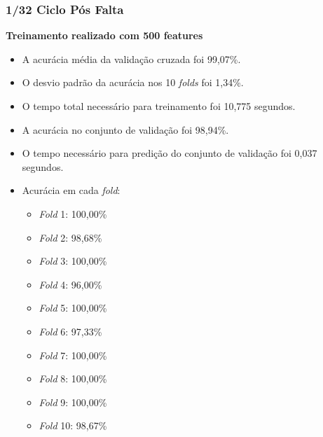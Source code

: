 \subsubsection{1/32 Ciclo Pós Falta}
\textbf{Treinamento realizado com 500 features}
\begin{itemize}
    \item A acurácia média da validação cruzada foi 99,07\%.
    \item O desvio padrão da acurácia nos 10 \textit{folds} foi 1,34\%.
    \item O tempo total necessário para treinamento foi 10,775 segundos.
    \item A acurácia no conjunto de validação foi 98,94\%.
    \item O tempo necessário para predição do conjunto de validação foi 0,037 segundos.
    \item Acurácia em cada \textit{fold}:
    \begin{itemize}
        \item \textit{Fold} 1: 100,00\%
        \item \textit{Fold} 2: 98,68\%
        \item \textit{Fold} 3: 100,00\%
        \item \textit{Fold} 4: 96,00\%
        \item \textit{Fold} 5: 100,00\%
        \item \textit{Fold} 6: 97,33\%
        \item \textit{Fold} 7: 100,00\%
        \item \textit{Fold} 8: 100,00\%
        \item \textit{Fold} 9: 100,00\%
        \item \textit{Fold} 10: 98,67\%
    \end{itemize}
\end{itemize}


